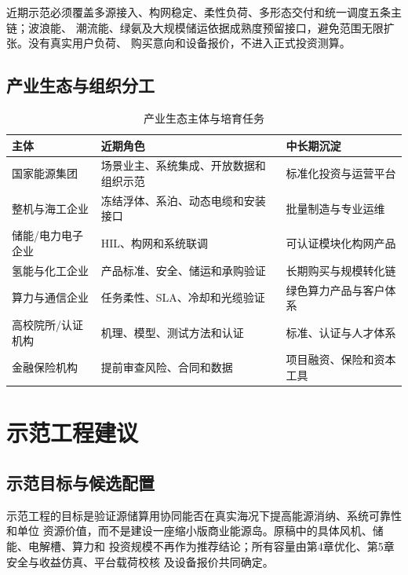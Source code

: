 近期示范必须覆盖多源接入、构网稳定、柔性负荷、多形态交付和统一调度五条主链；波浪能、
潮流能、绿氨及大规模储运依据成熟度预留接口，避免范围无限扩张。没有真实用户负荷、
购买意向和设备报价，不进入正式投资测算。

\subsection{产业生态与组织分工}

\begin{table}[H]
\centering
\caption{产业生态主体与培育任务}
\label{tab:c6-ecosystem}
\small
\begin{tabularx}{\textwidth}{p{2.7cm} X X}
\toprule
主体 & 近期角色 & 中长期沉淀\\
\midrule
国家能源集团 & 场景业主、系统集成、开放数据和组织示范 & 标准化投资与运营平台\\
整机与海工企业 & 冻结浮体、系泊、动态电缆和安装接口 & 批量制造与专业运维\\
储能/电力电子企业 & HIL、构网和系统联调 & 可认证模块化构网产品\\
氢能与化工企业 & 产品标准、安全、储运和承购验证 & 长期购买与规模转化链\\
算力与通信企业 & 任务柔性、SLA、冷却和光缆验证 & 绿色算力产品与客户体系\\
高校院所/认证机构 & 机理、模型、测试方法和认证 & 标准、认证与人才体系\\
金融保险机构 & 提前审查风险、合同和数据 & 项目融资、保险和资本工具\\
\bottomrule
\end{tabularx}
\end{table}

\section{示范工程建议}

\subsection{示范目标与候选配置}

示范工程的目标是验证源储算用协同能否在真实海况下提高能源消纳、系统可靠性和单位
资源价值，而不是建设一座缩小版商业能源岛。原稿中的具体风机、储能、电解槽、算力和
投资规模不再作为推荐结论；所有容量由第4章优化、第5章安全与收益仿真、平台载荷校核
及设备报价共同确定。

